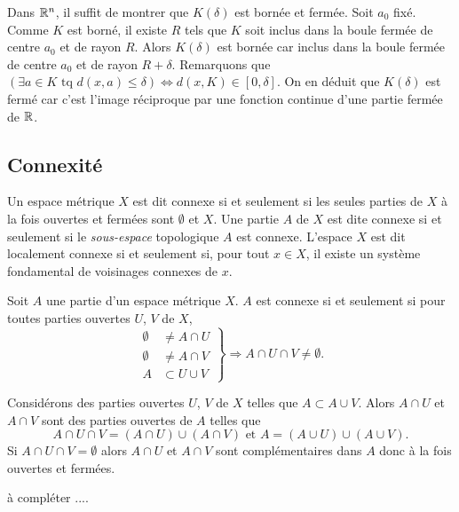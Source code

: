 \begin{demo}
 Dans $\mathbb{R}^n$, il suffit de montrer que $K(\delta)$ est bornée et fermée.\newline
 Soit $a_0$ fixé. Comme $K$ est borné, il existe $R$ tels que $K$ soit inclus dans la boule fermée de centre $a_0$ et de rayon $R$. Alors $K(\delta)$ est bornée car inclus dans la boule fermée de centre $a_0$ et de rayon $R + \delta$.\newline
 Remarquons que $(\exists a \in K \text{ tq } d(x,a)\leq \delta) \Leftrightarrow d(x,K) \in [0,\delta]$. On en déduit que $K(\delta)$ est fermé car c'est l'image réciproque par une fonction continue d'une partie fermée de $\mathbb{R}$.
\end{demo}

\subsection{Connexité}
\begin{defi} 
 Un espace métrique $X$ est dit connexe si et seulement si les seules parties de $X$ à la fois ouvertes et fermées sont $\emptyset$ et $X$. Une partie $A$ de $X$ est dite connexe si et seulement si le \emph{sous-espace} topologique $A$ est connexe.\newline
 L'espace $X$ est dit localement connexe si et seulement si, pour tout $x\in X$,  il existe un système fondamental de voisinages connexes de $x$.
\end{defi}

\begin{propn}
Soit $A$ une partie d'un espace métrique $X$.\newline
$A$ est connexe si et seulement si pour toutes parties ouvertes $U$, $V$ de $X$,
\begin{displaymath}
  \left.
    \begin{aligned}
       \emptyset &\neq A \cap U \\
       \emptyset &\neq A \cap V  \\
       A &\subset U \cup V
    \end{aligned}
  \right\rbrace
    \Rightarrow A\cap U \cap V \neq \emptyset.
\end{displaymath}
\end{propn}
\begin{demo}
Considérons des parties ouvertes $U$, $V$ de $X$ telles que $A \subset A \cup V$. Alors $A\cap U$ et $A\cap V$ sont des parties ouvertes de $A$ telles que
\begin{displaymath}
 A\cap U \cap V = (A\cap U) \cup (A\cap V) \text{ et } A = (A\cup U) \cup (A\cup V).
\end{displaymath}
Si $A\cap U \cap V = \emptyset$ alors $A\cap U$ et $A \cap V$ sont complémentaires dans $A$ donc à la fois ouvertes et fermées.

à compléter ....
\end{demo}

